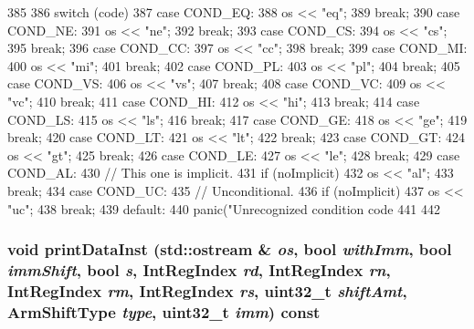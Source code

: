 \begin{DoxyCode}
385 {
386     switch (code) {
387       case COND_EQ:
388         os << "eq";
389         break;
390       case COND_NE:
391         os << "ne";
392         break;
393       case COND_CS:
394         os << "cs";
395         break;
396       case COND_CC:
397         os << "cc";
398         break;
399       case COND_MI:
400         os << "mi";
401         break;
402       case COND_PL:
403         os << "pl";
404         break;
405       case COND_VS:
406         os << "vs";
407         break;
408       case COND_VC:
409         os << "vc";
410         break;
411       case COND_HI:
412         os << "hi";
413         break;
414       case COND_LS:
415         os << "ls";
416         break;
417       case COND_GE:
418         os << "ge";
419         break;
420       case COND_LT:
421         os << "lt";
422         break;
423       case COND_GT:
424         os << "gt";
425         break;
426       case COND_LE:
427         os << "le";
428         break;
429       case COND_AL:
430         // This one is implicit.
431         if (noImplicit)
432             os << "al";
433         break;
434       case COND_UC:
435         // Unconditional.
436         if (noImplicit)
437             os << "uc";
438         break;
439       default:
440         panic("Unrecognized condition code %
441     }
442 }
\end{DoxyCode}
\hypertarget{classArmISA_1_1ArmStaticInst_a8ffe4c63f924a39c3916afb0cb24aad0}{
\subsubsection[{printDataInst}]{\setlength{\rightskip}{0pt plus 5cm}void printDataInst (std::ostream \& {\em os}, \/  bool {\em withImm}, \/  bool {\em immShift}, \/  bool {\em s}, \/  {\bf IntRegIndex} {\em rd}, \/  {\bf IntRegIndex} {\em rn}, \/  {\bf IntRegIndex} {\em rm}, \/  {\bf IntRegIndex} {\em rs}, \/  {\bf uint32\_\-t} {\em shiftAmt}, \/  {\bf ArmShiftType} {\em type}, \/  {\bf uint32\_\-t} {\em imm}) const}}
\label{classArmISA_1_1ArmStaticInst_a8ffe4c63f924a39c3916afb0cb24aad0}



